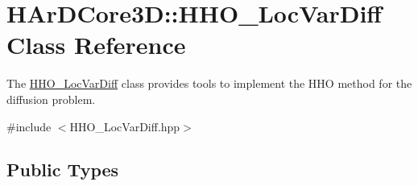 \hypertarget{classHArDCore3D_1_1HHO__LocVarDiff}{}\section{H\+Ar\+D\+Core3D\+:\+:H\+H\+O\+\_\+\+Loc\+Var\+Diff Class Reference}
\label{classHArDCore3D_1_1HHO__LocVarDiff}


The \hyperlink{classHArDCore3D_1_1HHO__LocVarDiff}{H\+H\+O\+\_\+\+Loc\+Var\+Diff} class provides tools to implement the H\+HO method for the diffusion problem.  




{\ttfamily \#include $<$H\+H\+O\+\_\+\+Loc\+Var\+Diff.\+hpp$>$}

\subsection*{Public Types}
